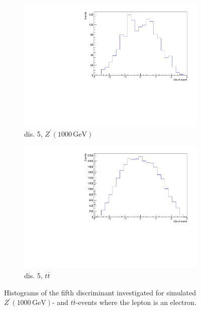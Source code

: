 \begin{figure}[H]
  \begin{subfigure}{0.45\textwidth}%
    \centering%
    \includegraphics[width=\textwidth]{plots/discriminant/zprime1000.el_dis5.pdf}%
    \caption{dis. 5, $Z^\prime(1000 \, \si{\giga\eV})$}%
    \label{fig:6a}%
  \end{subfigure}%
  \hfill
  \begin{subfigure}{0.45\textwidth}%
    \centering%
    \includegraphics[width=\textwidth]{plots/discriminant/ttbar.el_dis5.pdf}%
    \caption{dis. 5, $t \overline{t}$}%
    \label{fig:6b}%
  \end{subfigure}%
  \caption{Histograms of the fifth discriminant investigated for simulated $Z^\prime(1000 \, \si{\giga\eV})$- and $t \overline{t}$-events where the lepton is an electron.}%
  \label{fig:6}%
\end{figure}


